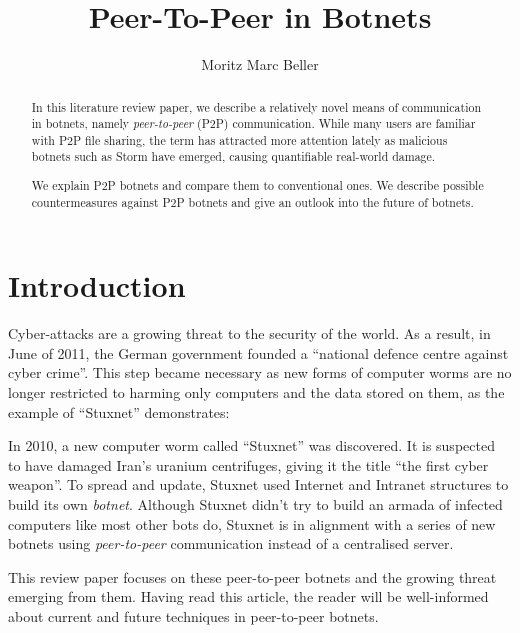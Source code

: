 \documentclass{llncs}
\title{Peer-To-Peer in Botnets}
\author{Moritz Marc Beller}
\institute{%
   Fakultät für Informatik, \\
   Technische Universität München \\
   \email{\{beller\}@in.tum.de}
}
\begin{document}
\maketitle

\begin{abstract}
In this literature review paper, we describe a relatively novel means
of communication in botnets, namely {\it peer-to-peer} (P2P)
communication.  While many users are familiar with P2P file sharing,
the term has attracted more attention lately as malicious botnets such
as Storm\cite{davis2008sybil} have emerged, causing quantifiable
real-world damage.

We explain P2P botnets and compare them to conventional ones. We
describe possible countermeasures against P2P botnets and give an
outlook into the future of botnets.
\end{abstract}

\section{Introduction}

Cyber-attacks are a growing threat to the security of the world. As a
result, in June of 2011, the German government founded a ``national
defence centre against cyber crime''.\cite{cyber} This step became
necessary as new forms of computer worms are no longer restricted to
harming only computers and the data stored on them, as the example of
``Stuxnet'' demonstrates:

 In 2010, a new computer worm called ``Stuxnet'' was discovered. It is
 suspected to have damaged Iran's uranium centrifuges, giving it the
 title ``the first cyber weapon''\cite{benzin2011first}. To spread and
 update, Stuxnet used Internet and Intranet structures to build its
 own {\it botnet}.\cite{fallierew32} Although Stuxnet didn't try to
 build an armada of infected computers like most other bots do,
 Stuxnet is in alignment with a series of new botnets using {\it
   peer-to-peer} communication instead of a centralised server.

This review paper focuses on these peer-to-peer botnets and the
growing threat emerging from them. Having read this article, the
reader will be well-informed about current and future techniques in
peer-to-peer botnets.
\end{document}
